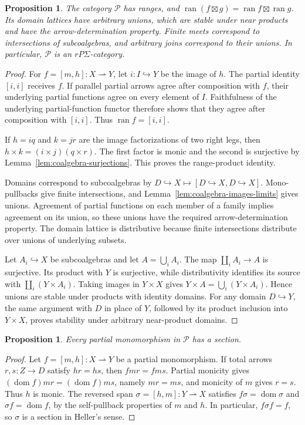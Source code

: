 \documentclass[11pt]{article}
\newtheorem{proposition}[theorem]{Proposition}
\newcommand{\dom}{\operatorname{dom}}\newcommand{\ran}{\operatorname{ran}}
\begin{document}
\begin{proposition}\label{prop:coalgebra-ranges-unions}
The category $\mathcal P$ has ranges, and
$\ran(f\boxtimes g)=\ran f\boxtimes\ran g$.
Its domain lattices have arbitrary unions, which are stable under near products and have the arrow-determination property. Finite meets correspond to intersections of subcoalgebras, and arbitrary joins correspond to their unions. In particular, $\mathcal P$ is an $rP\Sigma$-category.
\end{proposition}
\begin{proof}
For $f=[m,h]:X\rightharpoonup Y$, let $i:I\hookrightarrow Y$ be the image of $h$. The partial identity $[i,i]$ receives $f$. If parallel partial arrows agree after composition with $f$, their underlying partial functions agree on every element of $I$. Faithfulness of the underlying partial-function functor therefore shows that they agree after composition with $[i,i]$. Thus $\ran f=[i,i]$.

If $h=iq$ and $k=jr$ are the image factorizations of two right legs, then $h\times k=(i\times j)(q\times r)$. The first factor is monic and the second is surjective by Lemma~\ref{lem:coalgebra-surjections}. This proves the range-product identity.

Domains correspond to subcoalgebras by $D\hookrightarrow X\mapsto[D\hookrightarrow X,D\hookrightarrow X]$. Mono-pullbacks give finite intersections, and Lemma~\ref{lem:coalgebra-images-limits} gives unions. Agreement of partial functions on each member of a family implies agreement on its union, so these unions have the required arrow-determination property. The domain lattice is distributive because finite intersections distribute over unions of underlying subsets.

Let $A_i\hookrightarrow X$ be subcoalgebras and let $A=\bigcup_iA_i$. The map $\coprod_iA_i\to A$ is surjective. Its product with $Y$ is surjective, while distributivity identifies its source with $\coprod_i(Y\times A_i)$. Taking images in $Y\times X$ gives
$Y\times A=\bigcup_i(Y\times A_i)$.
Hence unions are stable under products with identity domains. For any domain $D\hookrightarrow Y$, the same argument with $D$ in place of $Y$, followed by its product inclusion into $Y\times X$, proves stability under arbitrary near-product domains.
\end{proof}

\begin{proposition}\label{prop:coalgebra-weak-choice}
Every partial monomorphism in $\mathcal P$ has a section.
\end{proposition}
\begin{proof}
Let $f=[m,h]:X\rightharpoonup Y$ be a partial monomorphism. If total arrows $r,s:Z\to D$ satisfy $hr=hs$, then $fmr=fms$. Partial monicity gives $(\dom f)mr=(\dom f)ms$, namely $mr=ms$, and monicity of $m$ gives $r=s$. Thus $h$ is monic. The reversed span $\sigma=[h,m]:Y\rightharpoonup X$ satisfies
$f\sigma=\dom\sigma$ and $\sigma f=\dom f$, by the self-pullback properties of $m$ and $h$. In particular, $f\sigma f=f$, so $\sigma$ is a section in Heller's sense.
\end{proof}
\end{document}
